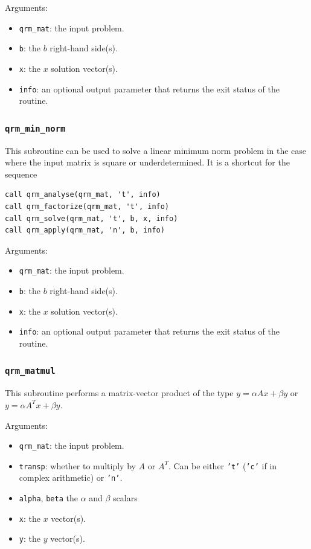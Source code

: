 \documentclass[11pt]{article}
\begin{document}
\noindent Arguments:
\begin{itemize}
\item \texttt{qrm\_mat}: the input problem.
\item \texttt{b}: the $b$ right-hand side(s).
\item \texttt{x}: the $x$ solution vector(s).
\item \texttt{info}: an optional output parameter that returns the
  exit status of the routine.
\end{itemize}

\subsubsection{\texttt{qrm\_min\_norm}}
This subroutine can be used to solve a linear minimum norm problem in
the case where the input matrix is square or underdetermined. It is a
shortcut for the sequence 
\begin{lstlisting}
call qrm_analyse(qrm_mat, 't', info)  
call qrm_factorize(qrm_mat, 't', info)  
call qrm_solve(qrm_mat, 't', b, x, info)  
call qrm_apply(qrm_mat, 'n', b, info)  
\end{lstlisting}
%

\noindent Arguments:
\begin{itemize}
\item \texttt{qrm\_mat}: the input problem.
\item \texttt{b}: the $b$ right-hand side(s).
\item \texttt{x}: the $x$ solution vector(s).
\item \texttt{info}: an optional output parameter that returns the
  exit status of the routine.
\end{itemize}



\subsubsection{\texttt{qrm\_matmul}}
This subroutine performs a matrix-vector product of the type $y =
\alpha Ax + \beta y$ or $y =\alpha A^Tx + \beta y$.


\noindent Arguments:
\begin{itemize}
\item \texttt{qrm\_mat}: the input problem.
\item \texttt{transp}: whether to multiply by $A$ or $A^T$. Can be either
  \texttt{'t'} (\texttt{'c'} if
  in complex arithmetic) or \texttt{'n'}.
\item \texttt{alpha}, \texttt{beta} the $\alpha$ and $\beta$ scalars
\item \texttt{x}: the $x$ vector(s).
\item \texttt{y}: the $y$ vector(s).
\end{itemize}
\end{document}

